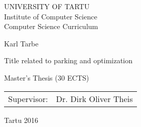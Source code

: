 \thispagestyle{empty}
\begin{center}

\large
UNIVERSITY OF TARTU\\[2mm]
Institute of Computer Science\\
Computer Science Curriculum\\[2mm]

\vspace{25mm}

\Large Karl Tarbe

\vspace{4mm}

\huge Title related to parking and optimization

\vspace{20mm}

\Large Master's Thesis (30 ECTS)

\end{center}

\vspace{2mm}

\begin{flushright}
 {
 \setlength{\extrarowheight}{5pt}
 \begin{tabular}{r l} 
  \sffamily Supervisor: & \sffamily Dr. Dirk Oliver Theis
 \end{tabular}
 }
\end{flushright}

\vfill
\centerline{Tartu 2016}
